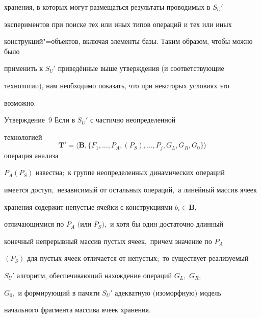 хранения, в которых могут размещаться результаты проводимых в $S_{U}'$

экспериментов при поиске тех или иных типов операций и тех или иных

конструкций"=объектов, включая элементы базы. Таким образом, чтобы можно было

применить к $S_{U}'$ приведённые выше утверждения (и соответствующие

технологии), нам необходимо показать, что при некоторых условиях это

возможно.



\smallskip



\hypertarget{kr:utv9}{}





\begin{newthm}{Утверждение~9} Если в $S_{U}'$ с частично неопределенной

технологией $$\mathbf{T}' = \langle \mathbf{B}, \{ F_{1},\ldots, P_{A},

(P_{S}),\ldots, P_{j}, G_{L}, G_{R}, G_{0}\}\rangle $$ операция анализа

$P_{A}(P_{S})$ известна$;$ к группе неопределенных динамических операций

имеется доступ$,$ независимый от остальных операций$,$ а линейный массив ячеек

хранения содержит непустые ячейки с конструкциями $b_{i} \in  \mathbf{B},$

отличающимися по $P_{A}$ $($или $P_{S}),$ и хотя бы один достаточно длинный

конечный непрерывный массив пустых ячеек$,$ причем значение по $P_{A}$

$(P_{S})$ для пустых ячеек отличается от непустых$;$ то существует реализуемый

$S_{U}'$ алгоритм, обеспечивающий нахождение операций $G_{L},$ $G_{R},$

$G_{0},$ и формирующий в памяти $S_{U}'$ адекватную $($изоморфную$)$ модель

начального фрагмента массива ячеек хранения$.$

\end{newthm}



\smallskip



